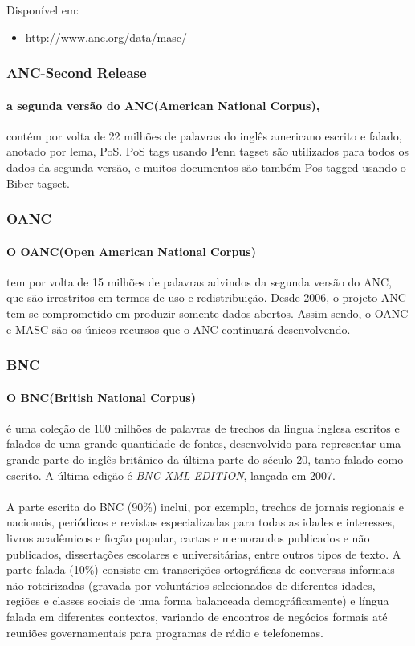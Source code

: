 \documentclass[a4paper, 10pt]{article}
\begin{document}
                Disponível em:
                \begin{itemize}
                    \item http://www.anc.org/data/masc/
                \end{itemize}
            \subsubsection{ANC-Second Release}
            	\paragraph{a segunda versão do ANC(American National Corpus),}contém por volta de 22 milhões de palavras do inglês americano escrito e falado, anotado por lema, PoS. PoS tags usando Penn tagset são utilizados para todos os dados da segunda versão, e muitos documentos são também Pos-tagged usando o Biber tagset.
            \subsubsection{OANC}
            	\paragraph{O OANC(Open American National Corpus)}tem por volta de 15 milhões de palavras advindos da segunda versão do ANC, que são irrestritos em termos de uso e redistribuição. Desde 2006, o projeto ANC tem se comprometido em produzir somente dados abertos. Assim sendo, o OANC e MASC são os únicos recursos que o ANC continuará desenvolvendo.
            \subsubsection{BNC}
            	\paragraph{O BNC(British National Corpus)}é uma coleção de 100 milhões de palavras de trechos da lingua inglesa escritos e falados de uma grande quantidade de fontes, desenvolvido para representar uma grande parte do inglês britânico da última parte do século 20, tanto falado como escrito. A última edição é \textit{BNC XML EDITION}, lançada em 2007.
                \paragraph{}A parte escrita do BNC (90\%) inclui, por exemplo, trechos de jornais regionais e nacionais, periódicos e revistas especializadas para todas as idades e interesses, livros acadêmicos e ficção popular, cartas e memorandos publicados e não publicados, dissertações escolares e universitárias, entre outros tipos de texto. A parte falada (10\%) consiste em transcrições ortográficas de conversas informais não roteirizadas (gravada por voluntários selecionados de diferentes idades, regiões e classes sociais de uma forma balanceada demográficamente) e língua falada em diferentes contextos, variando de encontros de negócios formais até reuniões governamentais para programas de rádio e telefonemas.
\end{document}
